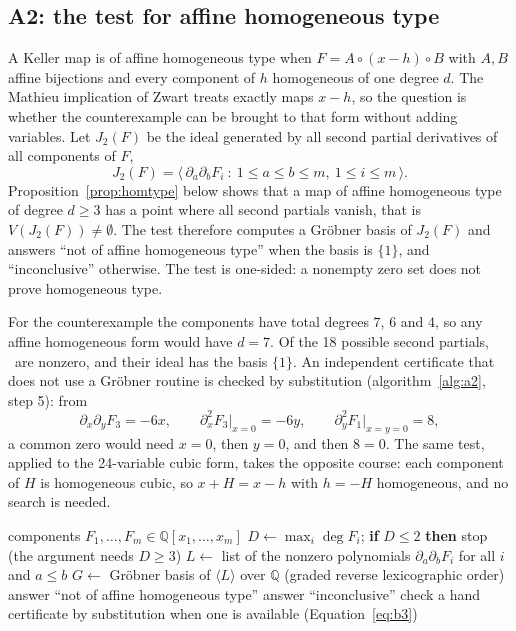 \documentclass[11pt]{article}
\theoremstyle{remark}
\newcommand{\Q}{\mathbb{Q}}
\begin{document}
\subsection{A2: the test for affine homogeneous type}\label{sec:a2}

A Keller map is of affine homogeneous type when $F=A\circ(x-h)\circ B$ with $A,B$ affine bijections and every component of $h$ homogeneous of one degree $d$. The Mathieu implication of Zwart treats exactly maps $x-h$, so the question is whether the counterexample can be brought to that form without adding variables. Let $J_2(F)$ be the ideal generated by all second partial derivatives of all components of $F$,
\begin{equation}\label{eq:j2}
J_2(F)=\big\langle\,\partial_a\partial_bF_i\ :\ 1\le a\le b\le m,\ 1\le i\le m\,\big\rangle .
\end{equation}
Proposition~\ref{prop:homtype} below shows that a map of affine homogeneous type of degree $d\ge3$ has a point where all second partials vanish, that is $V(J_2(F))\ne\emptyset$. The test therefore computes a Gr\"obner basis of $J_2(F)$ and answers ``not of affine homogeneous type'' when the basis is $\{1\}$, and ``inconclusive'' otherwise. The test is one-sided: a nonempty zero set does not prove homogeneous type.

For the counterexample the components have total degrees $7$, $6$ and $4$, so any affine homogeneous form would have $d=7$. Of the 18 possible second partials, \nsecondgens\ are nonzero, and their ideal has the basis $\{1\}$. An independent certificate that does not use a Gr\"obner routine is checked by substitution (algorithm~\ref{alg:a2}, step 5): from
\begin{equation}\label{eq:b3}
\partial_x\partial_yF_3=-6x,\qquad \partial_x^2F_3\big|_{x=0}=-6y,\qquad \partial_y^2F_1\big|_{x=y=0}=8,
\end{equation}
a common zero would need $x=0$, then $y=0$, and then $8=0$. The same test, applied to the 24-variable cubic form, takes the opposite course: each component of $H$ is homogeneous cubic, so $x+H=x-h$ with $h=-H$ homogeneous, and no search is needed.

\begin{algorithm}[t]
\caption{A2, the test for affine homogeneous type.}\label{alg:a2}
\begin{algorithmic}[1]
\Require components $F_1,\dots,F_m\in\Q[x_1,\dots,x_m]$
\State $D\gets\max_i\deg F_i$; \textbf{if} $D\le2$ \textbf{then} stop (the argument needs $D\ge3$)
\State $L\gets$ list of the nonzero polynomials $\partial_a\partial_bF_i$ for all $i$ and $a\le b$
\State $G\gets$ Gr\"obner basis of $\langle L\rangle$ over $\Q$ (graded reverse lexicographic order)
 \State answer ``not of affine homogeneous type''
\Else \State answer ``inconclusive'' \EndIf
\State check a hand certificate by substitution when one is available (Equation~\eqref{eq:b3})
\end{algorithmic}
\end{algorithm}
\end{document}
